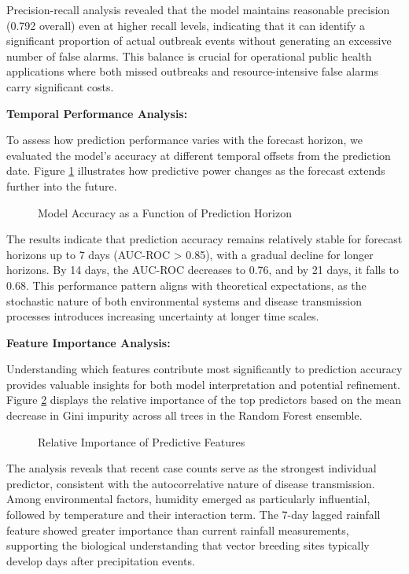 \documentclass[12pt,a4paper]{report}
\begin{document}
Precision-recall analysis revealed that the model maintains reasonable precision (0.792 overall) even at higher recall levels, indicating that it can identify a significant proportion of actual outbreak events without generating an excessive number of false alarms. This balance is crucial for operational public health applications where both missed outbreaks and resource-intensive false alarms carry significant costs.

\textbf{Temporal Performance Analysis:}

To assess how prediction performance varies with the forecast horizon, we evaluated the model's accuracy at different temporal offsets from the prediction date. Figure \ref{fig:temporal_performance} illustrates how predictive power changes as the forecast extends further into the future.

\begin{figure}[h]
\centering
\caption{Model Accuracy as a Function of Prediction Horizon}
\label{fig:temporal_performance}
\end{figure}

The results indicate that prediction accuracy remains relatively stable for forecast horizons up to 7 days (AUC-ROC > 0.85), with a gradual decline for longer horizons. By 14 days, the AUC-ROC decreases to 0.76, and by 21 days, it falls to 0.68. This performance pattern aligns with theoretical expectations, as the stochastic nature of both environmental systems and disease transmission processes introduces increasing uncertainty at longer time scales.

\textbf{Feature Importance Analysis:}

Understanding which features contribute most significantly to prediction accuracy provides valuable insights for both model interpretation and potential refinement. Figure \ref{fig:feature_importance} displays the relative importance of the top predictors based on the mean decrease in Gini impurity across all trees in the Random Forest ensemble.

\begin{figure}[h]
\centering
\caption{Relative Importance of Predictive Features}
\label{fig:feature_importance}
\end{figure}

The analysis reveals that recent case counts serve as the strongest individual predictor, consistent with the autocorrelative nature of disease transmission. Among environmental factors, humidity emerged as particularly influential, followed by temperature and their interaction term. The 7-day lagged rainfall feature showed greater importance than current rainfall measurements, supporting the biological understanding that vector breeding sites typically develop days after precipitation events.
\end{document}

